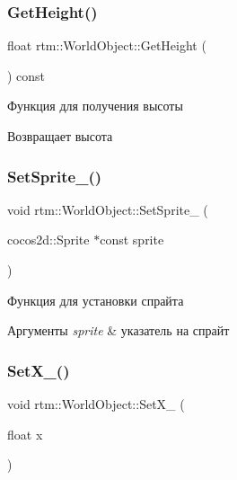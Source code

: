 \subsubsection{\texorpdfstring{Get\+Height()}{GetHeight()}}
{\footnotesize\ttfamily float rtm\+::\+World\+Object\+::\+Get\+Height (\begin{DoxyParamCaption}{ }\end{DoxyParamCaption}) const}

Функция для получения высоты \begin{DoxyReturn}{Возвращает}
высота 
\end{DoxyReturn}
\mbox{\label{classrtm_1_1_world_object_ae8f0605c11c95bf6eae8f42c24fc4130}} 
\subsubsection{\texorpdfstring{Set\+Sprite\+\_\+()}{SetSprite\_()}}
{\footnotesize\ttfamily void rtm\+::\+World\+Object\+::\+Set\+Sprite\+\_\+ (\begin{DoxyParamCaption}\item[{cocos2d\+::\+Sprite $\ast$const}]{sprite }\end{DoxyParamCaption})\hspace{0.3cm}{\ttfamily [protected]}}

Функция для установки спрайта 
\begin{DoxyParams}{Аргументы}
{\em sprite} & указатель на спрайт \\
\hline
\end{DoxyParams}
\mbox{\label{classrtm_1_1_world_object_a66fcf7be3345584be9f06e00a79da559}} 
\subsubsection{\texorpdfstring{Set\+X\+\_\+()}{SetX\_()}}
{\footnotesize\ttfamily void rtm\+::\+World\+Object\+::\+Set\+X\+\_\+ (\begin{DoxyParamCaption}\item[{float}]{x }\end{DoxyParamCaption})\hspace{0.3cm}{\ttfamily [protected]}}

